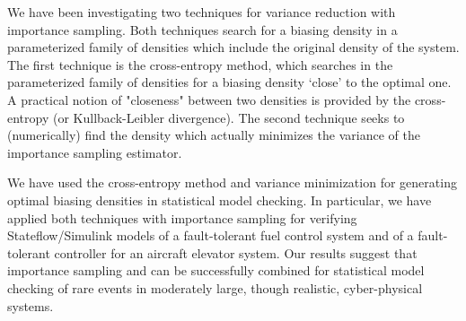 We have been investigating two techniques for variance reduction with importance sampling. Both techniques search for a biasing density in a parameterized family of densities which include the original density of the system. The first technique is the cross-entropy method, which searches in the parameterized family of densities for a biasing density `close' to the optimal one. A practical notion of "closeness" between two densities is provided by the cross-entropy (or Kullback-Leibler divergence). The second technique seeks to (numerically) find the density which actually minimizes the variance of the importance sampling estimator.

We have used the cross-entropy method and variance minimization for generating optimal biasing densities in statistical model checking. In particular, we have applied both techniques with importance sampling for verifying Stateflow/Simulink models of a fault-tolerant fuel control system and of a fault-tolerant controller for an aircraft elevator system. Our results suggest that importance sampling and can be successfully combined for statistical model checking of rare events in moderately large, though realistic, cyber-physical systems.

